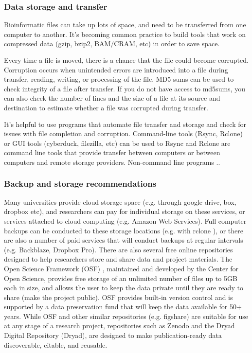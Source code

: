 \documentclass[10pt,letterpaper]{article}
\begin{document}


\subsubsection*{Data storage and transfer} 
Bioinformatic files can take up lots of space, and need to be transferred from one computer to another. It's becoming common practice to build tools that work on compressed data (gzip, bzip2, BAM/CRAM, etc) in order to save space.

Every time a file is moved, there is a chance that the file could become corrupted. Corruption occurs when unintended errors are introduced into a file during transfer, reading, writing, or processing of the file. MD5 sums can be used to check integrity of a file after transfer.
If you do not have access to md5sums, you can also check the number of lines and the size of a file at its source and destination to estimate whether a file was corrupted during transfer.

It’s helpful to use programs that automate file transfer and storage and check for issues with file completion and corruption. Command-line tools (Rsync, Rclone) or GUI tools (cyberduck, filezilla, etc) can be used to 
Rsync and Rclone are command line tools that provide transfer between computers or between computers and remote storage providers.
Non-command line programs ..

\subsubsection*{Backup and storage recommendations} 
Many universities provide cloud storage space (e.g. through google drive, box, dropbox etc), and researchers can pay for individual storage on these services, or services attached to cloud computing (e.g. Amazon Web Services). Full computer backups can be conducted to these storage locations (e.g. with rclone \cite{bailleul2016rclone}), or there are also a number of paid services that will conduct backups at regular intervals (e.g. Backblaze, Dropbox Pro). There are also several free online repositories designed to help researchers store and share data and project materials. The Open Science Framework (OSF) \cite{foster2017open}, maintained and developed by the Center for Open Science, provides free storage of an unlimited number of files up to 5GB each in size, and allows the user to keep the data private until they are ready to share (make the project public). OSF provides built-in version control and is supported by a data preservation fund that will keep the data available for 50+ years. While OSF and other similar repositories (e.g. figshare) are suitable for use at any stage of a research project, repositories such as Zenodo and the Dryad Digital Repository (Dryad), are designed to make publication-ready data discoverable, citable, and reusable. 
\end{document}
